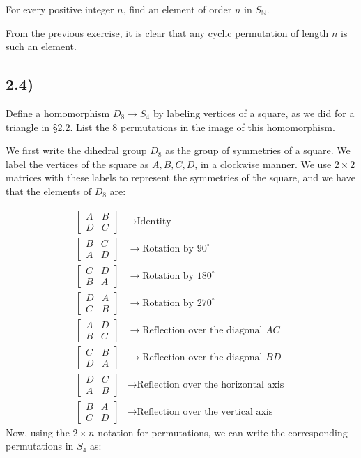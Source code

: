 For every positive integer $n$, find an element of order $n$ in $S_\mathbb{N}$.

From the previous exercise, it is clear that any cyclic permutation of length $n$ is such an element.


\subsection*{2.4)}

Define a homomorphism $D_8 \to S_4$ by labeling vertices of a square, as we did for a triangle in §2.2. List the 8 permutations in the image of this homomorphism.

We first write the dihedral group $D_8$ as the group of symmetries of a square. We label the vertices of the square as $A, B, C, D$, in a clockwise manner. We use $2\times2$ matrices with these labels to represent the symmetries of the square, and we have that the elements of $D_8$ are:

$$
\begin{aligned}
\begin{bmatrix}
A & B \\
D & C
\end{bmatrix} & \rightarrow \text{Identity} \\
\begin{bmatrix}
B & C \\
A & D
\end{bmatrix} & \rightarrow \text{Rotation by } 90^\circ \\
\begin{bmatrix}
C & D \\
B & A
\end{bmatrix} & \rightarrow \text{Rotation by } 180^\circ \\
\begin{bmatrix}
D & A \\
C & B
\end{bmatrix} & \rightarrow \text{Rotation by } 270^\circ \\
\begin{bmatrix}
A & D \\
B & C
\end{bmatrix} & \rightarrow \text{Reflection over the diagonal } AC \\
\begin{bmatrix}
C & B \\
D & A
\end{bmatrix} & \rightarrow \text{Reflection over the diagonal } BD \\
\begin{bmatrix}
D & C \\
A & B
\end{bmatrix} & \rightarrow \text{Reflection over the horizontal axis } \\
\begin{bmatrix}
B & A \\
C & D
\end{bmatrix} & \rightarrow \text{Reflection over the vertical axis }
\end{aligned}
$$
Now, using the $2 \times n$ notation for permutations, we can write the corresponding permutations in $S_4$ as:

